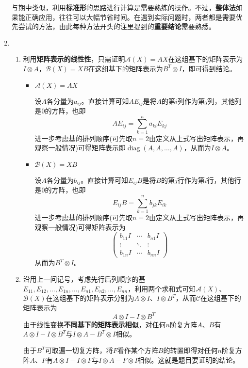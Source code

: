 \documentclass[a4paper,UTF8,fontset=windows,AutoFakeBold]{ctexart}
\DeclareMathOperator{\diag}{diag}
\newcommand*{\ma}{\mathcal{A}}
\newcommand*{\mb}{\mathcal{B}}
\newcommand*{\mc}{\mathcal{C}}
\newcommand*{\note}{\noindent *}
\begin{document}
\begin{enumerate}
\begin{itemize}
    \end{itemize}

    \note 与期中类似，利用\textbf{标准形}的思路进行计算是需要熟练的操作。不过，\textbf{整体法}如果能正确应用，往往可以大幅节省时间。在遇到实际问题时，两者都是需要优先尝试的方法，由此每种方法开头的注里提到的\textbf{重要结论}需要熟悉。

    \item 
    \begin{enumerate}
        \item 利用\textbf{矩阵表示的线性性}，只需证明$\ma(X)=AX$在这组基下的矩阵表示为$I\otimes A$，$\mb(X)=XB$在这组基下的矩阵表示为$B^T\otimes I$，即可得到结论。
        
        \begin{itemize}
            \item $\ma(X)=AX$
            
            设$A$各分量为$a_{ij}$。直接计算可知$AE_{ij}$是将$A$的第$i$列作为第$j$列，其他列是0的方阵，也即
            $$AE_{ij}=\sum_{k=1}^na_{ki}E_{kj}$$
            进一步考虑基的排列顺序(可先取$n=2$由定义从上式写出矩阵表示，再观察一般情况)可得矩阵表示即$\diag(A,A,\dots,A)$，从而为$I\otimes A$。

            \item $\mb(X)=XB$
            
            设$A$各分量为$b_{ij}$。直接计算可知$E_{ij}B$是将$B$的第$j$行作为第$i$行，其他行是0的方阵，也即
            $$E_{ij}B=\sum_{k=1}^nb_{jk}E_{ik}$$
            进一步考虑基的排列顺序(可先取$n=2$由定义从上式写出矩阵表示，再观察一般情况)可得矩阵表示为
            $$\begin{pmatrix}b_{11}I&\cdots&b_{n1}I\\\vdots&\ddots&\vdots\\b_{1n}I&\cdots&b_{nn}I\end{pmatrix}$$
            从而为$B^T\otimes I$。
        \end{itemize}

        \item
        沿用上一问记号，考虑先行后列顺序的基$E_{11},E_{12},\dots,E_{1n},\dots,E_{n1},E_{n2},\dots,E_{nn}$，利用两个求和式可知$\ma(X)$、$\mb(X)$在这组基下的矩阵表示分别为$A\otimes I$、$I\otimes B^T$，从而$\mc$在这组基下的矩阵表示为
        $$A\otimes I-I\otimes B^T$$
        由于线性变换\textbf{不同基下的矩阵表示相似}，对任何$n$阶复方阵$A$、$B$有$A\otimes I-I\otimes B^T$与$I\otimes A-B^T\otimes I$相似。
        
        由于$B^T$可取遍一切复方阵，将$F$看作某个方阵$B$的转置即得对任何$n$阶复方阵$A$、$F$有$A\otimes I-I\otimes F$与$I\otimes A-F\otimes I$相似。这就是题目要证明的结论。


\end{enumerate}
\end{enumerate}
\end{document}
